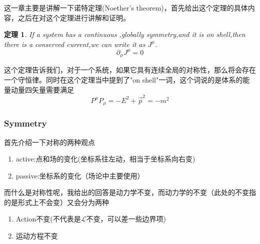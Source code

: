 \documentclass{article}
\newtheorem{theorem}{定理}
\begin{document}
这一章主要是讲解一下诺特定理(Noether's theorem)，首先给出这个定理的具体内容，之后在对这个定理进行讲解和证明。

\begin{theorem}
    If a system has a continuous ,globally symmetry,and it is on shell,then there is a  conserved current,we can write it as $J^\mu$.
    \begin{equation*}
        \partial_\mu J^\mu=0
    \end{equation*}
\end{theorem}

这个定理告诉我们，对于一个系统，如果它具有连续全局的对称性，那么将会存在一个守恒律。同时在这个定理当中提到了"on shell"一词，这个词说的是体系的能量动量四矢量需要满足
\begin{equation*}
    P^\mu P_\mu=-E^2+\vec{p}^2=-m^2
\end{equation*}

\subsubsection{Symmetry}

首先介绍一下对称的两种观点
\begin{enumerate}
    \item active:点和场的变化(坐标系往左动，相当于坐标系向右变)
    \item passive:坐标系的变化（场论中主要使用）
\end{enumerate}


而什么是对称性呢，我给出的回答是动力学不变，而动力学的不变（此处的不变指的是形式上不会变）又会分为两种
\begin{enumerate}
    \item Action不变(不代表是$\mathcal{L}$不变，可以差一些边界项)
    \item 运动方程不变
\end{enumerate}
\end{document}
